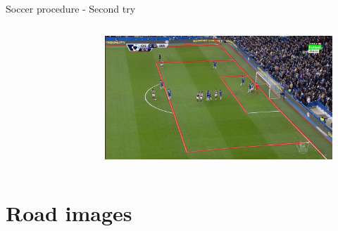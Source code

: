 \documentclass[12pt]{beamer}
\begin{document}
\begin{frame}{Soccer procedure - Second try}
\begin{columns}
{\begin{figure}
        \end{figure}
        \vspace{-1em}
        \begin{figure}
            \includegraphics[width=\textwidth]{resources/png/soccer_00020_04.png}
        \end{figure}
    }
    \end{columns}
\end{frame}

\section{Road images}
\end{document}
